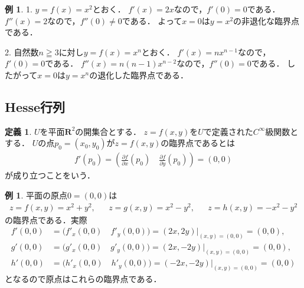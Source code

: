 \documentclass[11pt, a4paper, dvipdfmx]{jsarticle}
\theoremstyle{definition}
\newtheorem{Example}[Axiom]{例}
\newcommand{\rr}{\mathbf{R}}
\newcommand{\p}{\partial}
\theoremstyle{mystyle}
\newtheorem{DFN}[Axiom]{定義}
\newtheorem{EG}[Axiom]{例}
\numberwithin{equation}{section} %
\begin{document}
\begin{Example}
    1.
    $y=f(x)=x^2$とおく．
    $f'(x)=2x$なので，$f'(0)=0$である．
    $f''(x)=2$なので，$f''(0)\neq0$である．
    よって$x=0$は$y=x^2$の非退化な臨界点である．

    2.
    自然数$n\geqq 3$に対し$y=f(x)=x^n$とおく．
    $f'(x)=nx^{n-1}$なので，$f'(0)=0$である．
    $f''(x)=n(n-1)x^{n-2}$なので，$f''(0)=0$である．
    したがって$x=0$は$y=x^n$の退化した臨界点である．
\end{Example}


\subsection{Hesse行列}

\begin{DFN}
    $U$を平面$\rr^2$の開集合とする．
    $z=f(x,y)$を$U$で定義された$C^{\infty}$級関数とする．
    $U$の点$p_0=(x_0,y_0)$が$z=f(x,y)$の臨界点であるとは
    \begin{align}
        f'(p_0)=\left(\frac{\p f}{\p x}(p_0)\quad \frac{\p f}{\p y}(p_0)\right)=(0,0) \label{eq:crit2}
    \end{align}
    が成り立つことをいう．
\end{DFN}

\begin{EG}
    平面の原点$0=(0,0)$は
    \begin{align}
        z=f(x,y)=x^2+y^2,&& z=g(x,y)=x^2-y^2,&& z=h(x,y)=-x^2-y^2 \label{eq:quadFunc}
    \end{align}
    の臨界点である．実際
    \begin{align*}
        f'(0,0) &= \Big(f'_x(0,0)\quad f'_y(0,0)\Big)=(2x,2y)|_{(x,y)=(0,0)}=(0,0),  \\
        g'(0,0) &= \Big(g'_x(0,0)\quad g'_y(0,0)\Big)=(2x,-2y)|_{(x,y)=(0,0)}=(0,0),  \\
        h'(0,0) &= \Big(h'_x(0,0)\quad h'_y(0,0)\Big)=(-2x,-2y)|_{(x,y)=(0,0)}=(0,0)
    \end{align*}
    となるので原点はこれらの臨界点である．
\end{EG}
\end{document}
